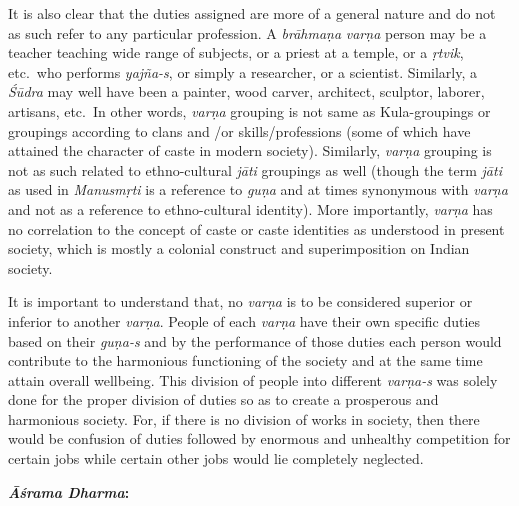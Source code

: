 It is also clear that the duties assigned are more of a general nature and do not as such refer to any particular profession. A \emph{brāhmaṇa} \emph{varṇa} person may be a teacher teaching wide range of subjects, or a priest at a temple, or a \emph{ṛtvik}, etc.\ who performs \emph{yajña-s}, or simply a researcher, or a scientist. Similarly, a \emph{Śūdra} may well have been a painter, wood carver, architect, sculptor, laborer, artisans, etc.\ In other words, \emph{varṇa} grouping is not same as Kula-groupings or groupings according to clans and /or skills/professions (some of which have attained the character of caste in modern society). Similarly, \emph{varṇa} grouping is not as such related to ethno-cultural \emph{jāti} groupings as well (though the term \emph{jāti} as used in \emph{Manusmṛti} is a reference to \emph{guṇa} and at times synonymous with \emph{varṇa} and not as a reference to ethno-cultural identity). More importantly, \emph{varṇa} has no correlation to the concept of caste or caste identities as understood in present society, which is mostly a colonial construct and superimposition on Indian society.
\vskip 2pt

It is important to understand that, no \emph{varṇa} is to be considered superior or inferior to another \emph{varṇa}. People of each \emph{varṇa} have their own specific duties based on their \emph{guṇa-s} and by the performance of those duties each person would contribute to the harmonious functioning of the society and at the same time attain overall wellbeing. This division of people into different \emph{varṇa-s} was solely done for the proper division of duties so as to create a prosperous and harmonious society. For, if there is no division of works in society, then there would be confusion of duties followed by enormous and unhealthy competition for certain jobs while certain other jobs would lie completely neglected.
\bigskip

\textbf{\emph{Āśrama} \emph{Dharma}:}

